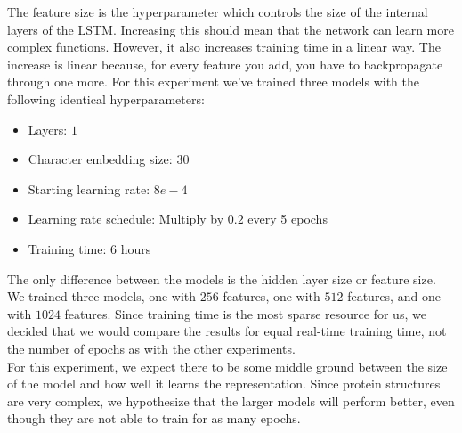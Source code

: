 The feature size is the hyperparameter which controls the size of the internal layers of the LSTM. Increasing this should mean that the network can learn more complex functions. However, it also increases training time in a linear way. The increase is linear because, for every feature you add, you have to backpropagate through one more. For this experiment we've trained three models with the following identical hyperparameters:
\begin{itemize}
    \item Layers: $1$
    \item Character embedding size: 30
    \item Starting learning rate: $8e-4$
    \item Learning rate schedule: Multiply by $0.2$ every 5 epochs
    \item Training time: 6 hours
\end{itemize}
The only difference between the models is the hidden layer size or feature size. We trained three models, one with $256$ features, one with $512$ features, and one with $1024$ features. Since training time is the most sparse resource for us, we decided that we would compare the results for equal real-time training time, not the number of epochs as with the other experiments.\\

\noindent
For this experiment, we expect there to be some middle ground between the size of the model and how well it learns the representation. Since protein structures are very complex, we hypothesize that the larger models will perform better, even though they are not able to train for as many epochs.
